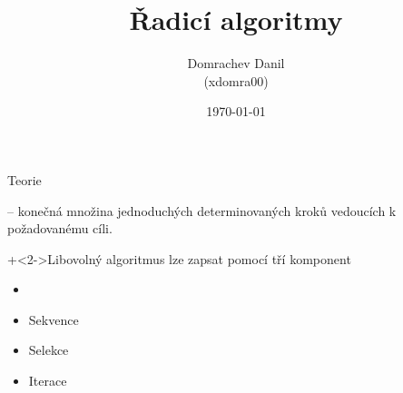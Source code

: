 \documentclass[11pt,final]{beamer}
\title{Řadicí algoritmy}
\author{Domrachev Danil\\(xdomra00)}
\date{\today}
\begin{document}

	
	\begin{frame}
		\titlepage
	\end{frame}
	
	
	\begin{frame}[<+->]{Teorie}
		\begin{block}{}
			 -- konečná množina jednoduchých determinovaných kroků vedoucích k požadovanému cíli.
		\end{block}
		\vfill
		\onslide+<2->{Libovolný algoritmus lze zapsat pomocí tří komponent}
		\begin{itemize}

			\item[\phantom{x}] \phantom{text}\\
			\item<3->[$\bullet$] Sekvence\\
			\item<4->[$\bullet$] Selekce\\
			\item<5->[$\bullet$] Iterace	
		\end{itemize}
		\vfill
	\end{frame}
\end{document}
